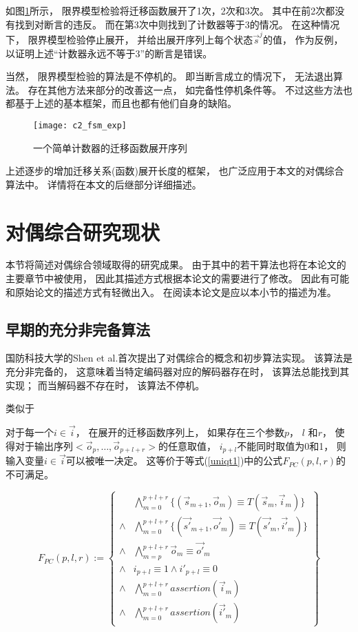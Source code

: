 如图\ref{c2_fsm_exp}所示，
限界模型检验将迁移函数展开了1次，2次和3次。
其中在前2次都没有找到对断言的违反。
而在第3次中则找到了计数器等于3的情况。
在这种情况下，
限界模型检验停止展开，
并给出展开序列上每个状态$\vec{s}^j$的值，
作为反例，
以证明上述“计数器永远不等于3”的断言是错误。

当然，
限界模型检验的算法是不停机的。
即当断言成立的情况下，
无法退出算法。
存在其他方法来部分的改善这一点，
如完备性停机条件等。
不过这些方法也都基于上述的基本框架，而且也都有他们自身的缺陷。

\begin{figure}[t]
  \centering
  \texttt{[image: c2\_fsm\_exp]}
  \caption{一个简单计数器的迁移函数展开序列}
  \label{c2_fsm_exp}
\end{figure}

上述逐步的增加迁移关系(函数)展开长度的框架，
也广泛应用于本文的对偶综合算法中。
详情将在本文的后继部分详细描述。

\section{对偶综合研究现状}\label{sec_now}
本节将简述对偶综合领域取得的研究成果。
由于其中的若干算法也将在本论文的主要章节中被使用，
因此其描述方式根据本论文的需要进行了修改。
因此有可能和原始论文的描述方式有轻微出入。
在阅读本论文是应以本小节的描述为准。

\subsection{早期的充分非完备算法}\label{subsec_sound}

国防科技大学的Shen et al.首次提出了对偶综合的概念和初步算法实现。
该算法是充分非完备的，
这意味着当特定编码器对应的解码器存在时，
该算法总能找到其实现；
而当解码器不存在时，
该算法不停机。

类似于

对于每一个$i\in\vec{i}$，
在展开的迁移函数序列上，
如果存在三个参数$p$， $l$ 和$r$，
使得对于输出序列$<\vec{o}_p,\dots,\vec{o}_{p+l+r}>$的任意取值，
$i_{p+l}$不能同时取值为0和1，
则输入变量$i\in\vec{i}$可以被唯一决定。
这等价于等式(\ref{uniqt1})中的公式$F_{PC}(p,l,r)$的不可满足。

\begin{equation}\label{uniqt1}
F_{PC}(p,l,r):=
\left\{
\begin{array}{cc}
&\bigwedge_{m=0}^{p+l+r}
\{
(\vec{s}_{m+1},\vec{o}_m)\equiv T(\vec{s}_m,\vec{i}_m)
\}
\\
\wedge&\bigwedge_{m=0}^{p+l+r}
\{
(\vec{s'}_{m+1},\vec{o'}_m)\equiv T(\vec{s'}_m,\vec{i'}_m)
\}
\\
\wedge&\bigwedge_{m=p}^{p+l+r}\vec{o}_m\equiv \vec{o'}_m \\
\wedge& i_{p+l}\equiv 1 \wedge  i'_{p+l}\equiv 0 \\
\wedge&\bigwedge_{m=0}^{p+l+r}assertion(\vec{i}_m) \\
\wedge&\bigwedge_{m=0}^{p+l+r}assertion(\vec{i'}_m)
\end{array}
\right\}
\end{equation}

